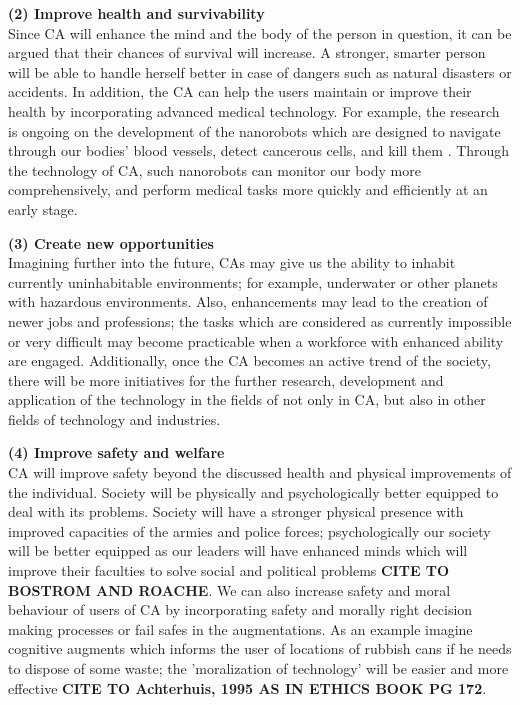{\bf (2) Improve health and survivability} \\
Since CA will enhance the mind and the body of the person in question, it can be argued that their chances of survival will increase. A stronger, smarter person will be able to handle herself better in case of dangers such as natural disasters or accidents. In addition, the CA can help the users maintain or improve their health by incorporating advanced medical technology. For example, the research is ongoing on the development of the nanorobots which are designed to navigate through our bodies' blood vessels, detect cancerous cells, and kill them \cite{nanorobot}. Through the technology of CA, such nanorobots can monitor our body more comprehensively, and perform medical tasks more quickly and efficiently at an early stage. 

{\bf (3) Create new opportunities}\\
Imagining further into the future, CAs may give us the ability to inhabit currently uninhabitable environments; for example, underwater or other planets with hazardous environments. Also, enhancements may lead to the creation of newer jobs and professions; the tasks which are considered as currently impossible or very difficult may become practicable when a workforce with enhanced ability are engaged. Additionally, once the CA becomes an active trend of the society, there will be more initiatives for the further research, development and application of the technology in the fields of not only in CA, but also in other fields of technology and industries.

{\bf (4) Improve safety and welfare}\\
CA will improve safety beyond the discussed health and physical improvements of the individual. Society will be physically and psychologically better equipped to deal with its problems. Society will have a stronger physical presence with improved capacities of the armies and police forces; psychologically our society will be better equipped as our leaders will have enhanced minds which will improve their faculties to solve social and political problems {\bf CITE TO BOSTROM AND ROACHE}. We can also increase safety and moral behaviour of users of CA by incorporating safety and morally right decision making processes or fail safes in the augmentations. As an example imagine cognitive augments which informs the user of locations of rubbish cans if he needs to dispose of some waste; the 'moralization of technology' will be easier and more effective {\bf CITE TO Achterhuis, 1995 AS IN ETHICS BOOK PG 172}.

